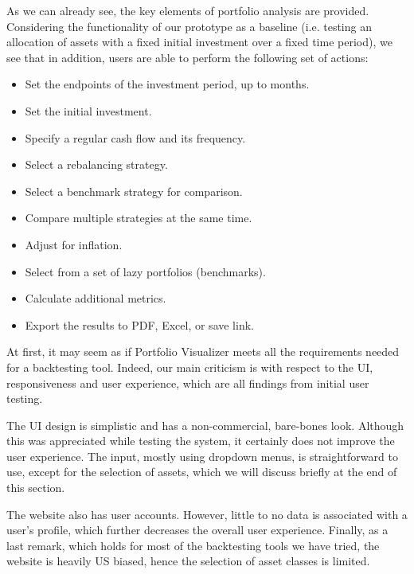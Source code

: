 \documentclass[main.tex]{subfiles}
\begin{document}
As we can already see, the key elements of portfolio analysis are provided. Considering the functionality of our prototype as a baseline (i.e. testing an allocation of assets with a fixed initial investment over a fixed time period), we see that in addition, users are able to perform the following set of actions:

\begin{itemize}
  \item Set the endpoints of the investment period, up to months.
  \item Set the initial investment. 
  \item Specify a regular cash flow and its frequency.
  \item Select a rebalancing strategy.
  \item Select a benchmark strategy for comparison.
  \item Compare multiple strategies at the same time.
  \item Adjust for inflation.
  \item Select from a set of lazy portfolios (benchmarks).
  \item Calculate additional metrics.
  \item Export the results to PDF, Excel, or save link. 
\end{itemize}

At first, it may seem as if Portfolio Visualizer meets all the requirements needed for a backtesting tool. Indeed, our main criticism is with respect to the UI, responsiveness and user experience, which are all findings from initial user testing. 

The UI design is simplistic and has a non-commercial, bare-bones look. Although this was appreciated while testing the system, it certainly does not improve the user experience. The input, mostly using dropdown menus, is straightforward to use, except for the selection of assets, which we will discuss briefly at the end of this section.


The website also has user accounts. However, little to no data is associated with a user's profile, which further decreases the overall user experience. Finally, as a last remark, which holds for most of the backtesting tools we have tried, the website is heavily US biased, hence the selection of asset classes is limited.
\end{document}
